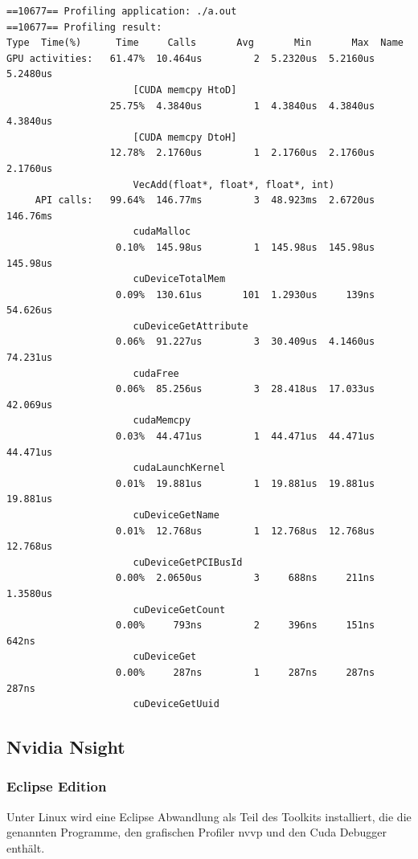             \begin{lstlisting}[caption=nvprof Output]   
==10677== Profiling application: ./a.out
==10677== Profiling result:
Type  Time(%)      Time     Calls       Avg       Min       Max  Name      
GPU activities:   61.47%  10.464us         2  5.2320us  5.2160us  5.2480us  
                      [CUDA memcpy HtoD]
                  25.75%  4.3840us         1  4.3840us  4.3840us  4.3840us  
                      [CUDA memcpy DtoH]
                  12.78%  2.1760us         1  2.1760us  2.1760us  2.1760us  
                      VecAdd(float*, float*, float*, int)                           
     API calls:   99.64%  146.77ms         3  48.923ms  2.6720us  146.76ms  
                      cudaMalloc
                   0.10%  145.98us         1  145.98us  145.98us  145.98us  
                      cuDeviceTotalMem
                   0.09%  130.61us       101  1.2930us     139ns  54.626us  
                      cuDeviceGetAttribute
                   0.06%  91.227us         3  30.409us  4.1460us  74.231us  
                      cudaFree
                   0.06%  85.256us         3  28.418us  17.033us  42.069us  
                      cudaMemcpy
                   0.03%  44.471us         1  44.471us  44.471us  44.471us  
                      cudaLaunchKernel
                   0.01%  19.881us         1  19.881us  19.881us  19.881us  
                      cuDeviceGetName
                   0.01%  12.768us         1  12.768us  12.768us  12.768us  
                      cuDeviceGetPCIBusId
                   0.00%  2.0650us         3     688ns     211ns  1.3580us  
                      cuDeviceGetCount
                   0.00%     793ns         2     396ns     151ns     642ns 
                      cuDeviceGet
                   0.00%     287ns         1     287ns     287ns     287ns  
                      cuDeviceGetUuid
            \end{lstlisting}
            
			\subsection{Nvidia Nsight}
			    \subsubsection*{Eclipse Edition}
			    Unter Linux wird eine Eclipse Abwandlung als Teil des Toolkits installiert, die die genannten Programme, den grafischen Profiler nvvp und den Cuda Debugger enthält.
			    
